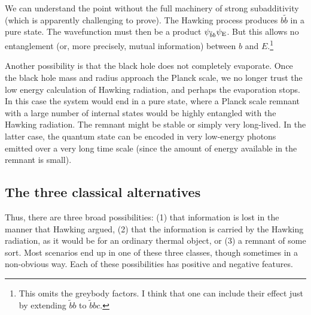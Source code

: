 \documentclass[12pt]{article}
\begin{document}
We can understand the point without the full machinery of strong subadditivity (which is apparently challenging to prove).  The Hawking process produces $b\tilde b$ in a pure state.  The wavefunction must then be a product $\psi_{\tilde b b} \psi_{\rm E}$.  But this allows no entanglement (or, more precisely, mutual information) between $b$ and $E$.\footnote{This omits the greybody factors.  I think that one can include their effect just by extending $\tilde b b$ to $\tilde b b c$.}


Another possibility is that the black hole does not completely evaporate.  Once the black hole mass and radius approach the Planck scale, we no longer trust the low energy calculation of Hawking radiation, and perhaps the evaporation stops.  In this case the system would end in a pure state, where a Planck scale remnant with a large number of internal states would be highly entangled with the Hawking radiation.  The remnant might be stable or simply very long-lived.  In the latter case, the quantum state can be encoded in very low-energy photons emitted over a very long time scale (since the amount of energy available in the remnant is small).

\subsection{The three classical alternatives}

Thus, there are three broad possibilities: (1) that information is lost in the manner that Hawking argued, (2) that the information is carried by the Hawking radiation, as it would be for an ordinary thermal object, or (3) a remnant of some sort.  Most scenarios end up in one of these three classes, though sometimes in a non-obvious way. 
Each of these possibilities has positive and negative features.  
\end{document}
